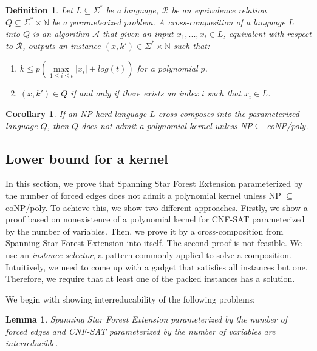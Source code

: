 \documentclass[en]{pracamgr}
\newtheorem{definition}{Definition}
\newtheorem{lemma}{Lemma}
\newtheorem{corollary}{Corollary}
\newcommand{\ssfep}{{\sc Spanning Star Forest Extension}}
\newcommand{\cnfsat}{{\sc CNF-SAT}}
\begin{document}
\begin{definition}\label{cross-composition}
	Let $L \subseteq \Sigma^*$ be a language, $\mathcal{R}$ be an equivalence relation $Q \subseteq \Sigma^* \times \mathbb{N}$ be a parameterized problem. A \textup{cross-composition} of a language $L$ into $Q$ is an algorithm $\mathcal{A}$ that given an input $x_1,...,x_t \in L$, equivalent with respect to $\mathcal{R}$, outputs an instance $(x,k') \in \Sigma^* \times \mathbb{N}$ such that:
	\begin{enumerate}
		\item $k \leq p(\max\limits_{1 \leq i \leq t} |x_i| + log(t))$ for a polynomial $p$.
		\item $(x,k') \in Q$ if and only if there exists an index $i$ such that $x_i \in L$.
	\end{enumerate}
\end{definition}

\begin{corollary}\label{nokernel}
	If an NP-hard language $L$ cross-composes into the parameterized language $Q$, then $Q$ does not admit a polynomial kernel unless \textup{NP$\subseteq$ coNP/poly}.
\end{corollary}

\subsection{Lower bound for a kernel}

In this section, we prove that \ssfep{} parameterized by the number of forced edges does not admit a polynomial kernel unless NP $\subseteq$ coNP/poly. To achieve this, we show two different approaches. Firstly, we show a proof based on nonexistence of a polynomial kernel for \cnfsat{} parameterized by the number of variables. Then,  we prove it by a cross-composition from \ssfep{} into itself. The second proof is not feasible. We use an \emph{instance selector}, a pattern commonly applied to solve a composition. Intuitively, we need to come up with a gadget that satisfies all instances but one. Therefore, we require that at least one of the packed instances has a solution.

We begin with showing interreducability of the following problems:

\begin{lemma}
	\ssfep{} parameterized by the number of forced edges and \cnfsat{} parameterized by the number of variables are interreducible.
\end{lemma}
\end{document}
